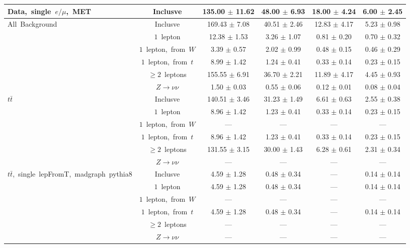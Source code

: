 \documentclass{article}
\begin{document}
\begin{longtable}{|l|c|c|c|c|c|}
\multirow{1}{*}{Data,~single~$e/\mu$,~MET} & Inclusve  & 135.00 $\pm$ 11.62  & 48.00 $\pm$ 6.93  & 18.00 $\pm$ 4.24  & 6.00 $\pm$ 2.45 \\* 
\hline \hline 
\multirow{6}{*}{All~Background} & Inclusve  & 169.43 $\pm$ 7.08  & 40.51 $\pm$ 2.46  & 12.83 $\pm$ 4.17  & 5.23 $\pm$ 0.98 \\* 
 & $1$~lepton  & 12.38 $\pm$ 1.53  & 3.26 $\pm$ 1.07  & 0.81 $\pm$ 0.20  & 0.70 $\pm$ 0.32 \\* 
 & $1$~lepton,~from~$W$  & 3.39 $\pm$ 0.57  & 2.02 $\pm$ 0.99  & 0.48 $\pm$ 0.15  & 0.46 $\pm$ 0.29 \\* 
 & $1$~lepton,~from~$t$  & 8.99 $\pm$ 1.42  & 1.24 $\pm$ 0.41  & 0.33 $\pm$ 0.14  & 0.23 $\pm$ 0.15 \\* 
 & $\ge2$~leptons  & 155.55 $\pm$ 6.91  & 36.70 $\pm$ 2.21  & 11.89 $\pm$ 4.17  & 4.45 $\pm$ 0.93 \\* 
 & $Z\rightarrow\nu\nu$  & 1.50 $\pm$ 0.03  & 0.55 $\pm$ 0.06  & 0.12 $\pm$ 0.01  & 0.08 $\pm$ 0.04 \\* 
\hline 
\multirow{6}{*}{$t\bar{t}$} & Inclusve  & 140.51 $\pm$ 3.46  & 31.23 $\pm$ 1.49  & 6.61 $\pm$ 0.63  & 2.55 $\pm$ 0.38 \\* 
 & $1$~lepton  & 8.96 $\pm$ 1.42  & 1.23 $\pm$ 0.41  & 0.33 $\pm$ 0.14  & 0.23 $\pm$ 0.15 \\* 
 & $1$~lepton,~from~$W$  & ---  & ---  & ---  & --- \\* 
 & $1$~lepton,~from~$t$  & 8.96 $\pm$ 1.42  & 1.23 $\pm$ 0.41  & 0.33 $\pm$ 0.14  & 0.23 $\pm$ 0.15 \\* 
 & $\ge2$~leptons  & 131.55 $\pm$ 3.15  & 30.00 $\pm$ 1.43  & 6.28 $\pm$ 0.61  & 2.31 $\pm$ 0.34 \\* 
 & $Z\rightarrow\nu\nu$  & ---  & ---  & ---  & --- \\* 
\hline 
\multirow{6}{*}{$t\bar{t}$,~single~lepFromT,~madgraph~pythia8} & Inclusve  & 4.59 $\pm$ 1.28  & 0.48 $\pm$ 0.34  & ---  & 0.14 $\pm$ 0.14 \\* 
 & $1$~lepton  & 4.59 $\pm$ 1.28  & 0.48 $\pm$ 0.34  & ---  & 0.14 $\pm$ 0.14 \\* 
 & $1$~lepton,~from~$W$  & ---  & ---  & ---  & --- \\* 
 & $1$~lepton,~from~$t$  & 4.59 $\pm$ 1.28  & 0.48 $\pm$ 0.34  & ---  & 0.14 $\pm$ 0.14 \\* 
 & $\ge2$~leptons  & ---  & ---  & ---  & --- \\* 
 & $Z\rightarrow\nu\nu$  & ---  & ---  & ---  & --- \\* 
\hline 

\end{longtable}
\end{document}
